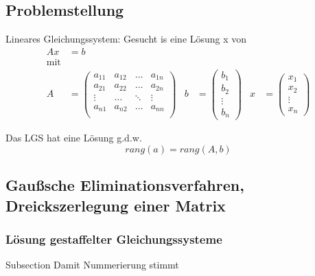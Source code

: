 \documentclass[
	ngerman,
	accentcolor=9c,%
	type=intern,
	marginpar=false
	]{tudapub}
\begin{document}
        \subsection{Problemstellung}
            Lineares Gleichungssystem: Gesucht is eine Lösung x von 
            \begin{align*}
                Ax &= b\\
                \text{mit}\\
                A &= 
                \begin{pmatrix}
                    a_{11} & a_{12} & \dots & a_{1n}\\
                    a_{21} & a_{22} & \dots & a_{2n}\\
                    \vdots & \dots & \ddots & \vdots\\
                    a_{n1} & a_{n2} & \dots & a_{nn}\\
                \end{pmatrix} &
                b &= 
                \begin{pmatrix}
                    b_1\\
                    b_2\\
                    \vdots\\
                    b_n
                \end{pmatrix} &
                x &= 
                \begin{pmatrix}
                    x_1\\
                    x_2\\
                    \vdots\\
                    x_n
                \end{pmatrix}
            \end{align*}
            \begin{definition}
                Das LGS hat eine Lösung g.d.w.
                \begin{equation*}
                    rang(a) = rang(A,b)
                \end{equation*}
            \end{definition}
        \subsection{Gaußsche Eliminationsverfahren, Dreickszerlegung einer Matrix}
            \subsubsection{Lösung gestaffelter Gleichungssysteme}
                Subsection Damit Nummerierung stimmt
\end{document}
